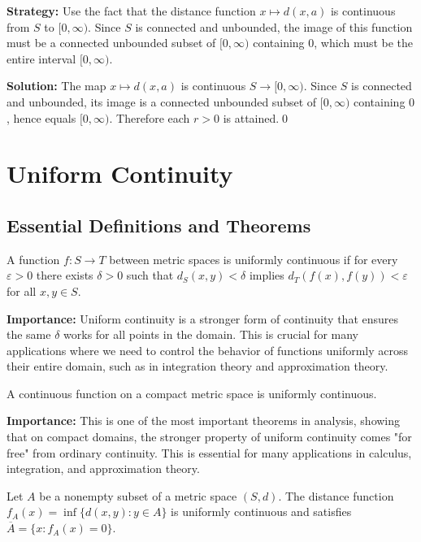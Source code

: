 \noindent\textbf{Strategy:} Use the fact that the distance function $x \mapsto d(x,a)$ is continuous from $S$ to $[0,\infty)$. Since $S$ is connected and unbounded, the image of this function must be a connected unbounded subset of $[0,\infty)$ containing $0$, which must be the entire interval $[0,\infty)$.

\bigskip\noindent\textbf{Solution:}
The map $x\mapsto d(x,a)$ is continuous $S\to[0,\infty)$. Since $S$ is connected and unbounded, its image is a connected unbounded subset of $[0,\infty)$ containing $0$, hence equals $[0,\infty)$. Therefore each $r>0$ is attained.\qed

\section{Uniform Continuity}

\subsection*{Essential Definitions and Theorems}

\begin{definition}
A function $f: S \to T$ between metric spaces is uniformly continuous if for every $\varepsilon > 0$ there exists $\delta > 0$ such that $d_S(x,y) < \delta$ implies $d_T(f(x), f(y)) < \varepsilon$ for all $x,y \in S$.
\end{definition}

\noindent\textbf{Importance:} Uniform continuity is a stronger form of continuity that ensures the same $\delta$ works for all points in the domain. This is crucial for many applications where we need to control the behavior of functions uniformly across their entire domain, such as in integration theory and approximation theory.



\begin{theorem}
A continuous function on a compact metric space is uniformly continuous.
\end{theorem}

\noindent\textbf{Importance:} This is one of the most important theorems in analysis, showing that on compact domains, the stronger property of uniform continuity comes "for free" from ordinary continuity. This is essential for many applications in calculus, integration, and approximation theory.



\begin{theorem}
Let $A$ be a nonempty subset of a metric space $(S,d)$. The distance function $f_A(x) = \inf\{d(x,y) : y \in A\}$ is uniformly continuous and satisfies $\overline{A} = \{x : f_A(x) = 0\}$.
\end{theorem}

